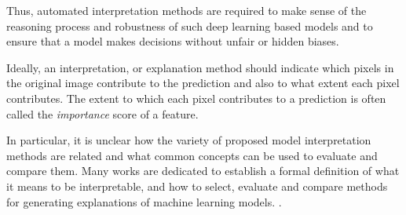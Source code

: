 




Thus, automated interpretation methods are required to make sense of the reasoning process and robustness of such deep learning based models and to ensure that a model makes decisions without unfair or hidden biases. 



Ideally, an interpretation, or explanation method should indicate which pixels in the original image contribute to the prediction and also to what extent each pixel contributes. The extent to which each pixel contributes to a prediction is often called the \textit{importance} score of a feature. 


















In particular, it is unclear how the variety of proposed model interpretation methods are related and what common concepts can be used to evaluate and compare them. 
Many works are dedicated to establish a formal definition of what it means to be interpretable, and how to select, evaluate and compare methods for generating explanations of machine learning models. \cite{murdoch2019definitions, lipton2018mythos}.







